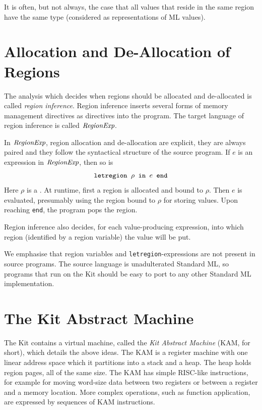\documentclass[12pt]{book}
\begin{document}
It is often, but not always, the case that all values that reside in the
same region have the same type (considered as representations of ML values).
 
\section{Allocation and De-Allocation of Regions}
\label{aldeal.sec}
The analysis which decides when regions should be allocated and de-allocated
is called {\em region inference}. Region inference inserts 
several forms of memory management directives
as directives into the program.
The target language of region inference is called $\hbox{\it RegionExp}$.

In $\hbox{\it RegionExp}$, 
region allocation and de-allocation are explicit, they are always paired 
and they follow
the syntactical structure of the source program. 
If $e$ is an expression in $\hbox{\it RegionExp}$, then so is
$$\hbox{\tt letregion $\rho$ in $e$ end}$$
Here $\rho$ is a . At runtime, first a region
is allocated and bound to $\rho$. Then $e$ is evaluated, presumably using
the region bound to $\rho$ for storing values. Upon reaching {\tt end}, the program pops the
region.

Region inference also decides, for each value-producing expression, 
into which region (identified by a region variable) the value will be put.

We emphasise that region variables and {\tt letregion}-expressions are
not present in source programs. The source language is unadulterated
Standard ML, so programs  that run on the Kit should be easy to port to any 
other Standard ML implementation.


\section{The Kit Abstract Machine}
The Kit contains a virtual machine, called
the {\em Kit Abstract Machine} (KAM, for short), which details the
above ideas. The KAM is a register machine with one linear address
space which it partitions into a stack and a heap. The heap holds
region pages, all of the same size.  The KAM has simple RISC-like
instructions, for example for moving word-size data between two
registers or between a register and a memory location.  More complex
operations, such as function application, are expressed by sequences
of KAM instructions.
\end{document}
